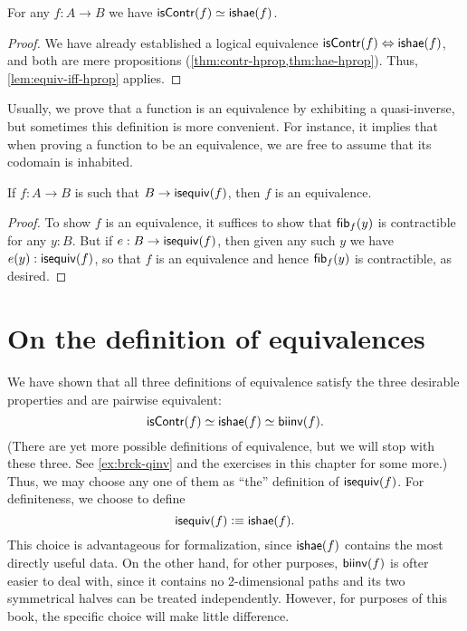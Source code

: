 \begin{thm}\label{thm:equiv-contr-hae}
  For any $f:A\to B$ we have $\mathsf{isContr}(f) \simeq \mathsf{ishae}(f)$.
\end{thm}
\begin{proof}
  We have already established a logical equivalence ${\mathsf{isContr}(f)} \Leftrightarrow {\ensuremath{\mathsf{ishae}}(f)}$, and both are mere propositions (\cref{thm:contr-hprop,thm:hae-hprop}).
  Thus, \autoref{lem:equiv-iff-hprop} applies.
\end{proof}

Usually, we prove that a function is an equivalence by exhibiting a quasi-inverse, but sometimes this definition is more convenient.
For instance, it implies that when proving a function to be an equivalence, we are free to assume that its codomain is inhabited.

\begin{cor}\label{thm:equiv-inhabcod}
  If $f:A\to B$ is such that $B\to \mathsf{isequiv}(f)$, then $f$ is an equivalence.
\end{cor}
\begin{proof}
  To show $f$ is an equivalence, it suffices to show that ${\mathsf{fib}}_{f}(y)$ is contractible for any $y:B$.
  But if $e:B\to \mathsf{isequiv}(f)$, then given any such $y$ we have $e(y):\mathsf{isequiv}(f)$, so that $f$ is an equivalence and hence ${\mathsf{fib}}_{f}(y)$ is contractible, as desired.
\end{proof}


\section{On the definition of equivalences}
\label{sec:concluding-remarks}

We have shown that all three definitions of equivalence satisfy the three desirable properties and are pairwise equivalent:
\[ \mathsf{isContr}(f) \simeq \mathsf{ishae}(f) \simeq \mathsf{biinv}(f) . \]
(There are yet more possible definitions of equivalence, but we will stop with these three.
See \autoref{ex:brck-qinv} and the exercises in this chapter for some more.)
Thus, we may choose any one of them as ``the'' definition of $\mathsf{isequiv} (f)$.
For definiteness, we choose to define
\[ \mathsf{isequiv}(f) \vcentcolon\equiv \mathsf{ishae}(f).\]
This choice is advantageous for formalization, since $\mathsf{ishae}(f)$ contains the most directly useful data.
On the other hand, for other purposes, $\mathsf{biinv}(f)$ is ofter easier to deal with, since it contains no 2-dimensional paths and its two symmetrical halves can be treated independently.
However, for purposes of this book, the specific choice will make little difference.

